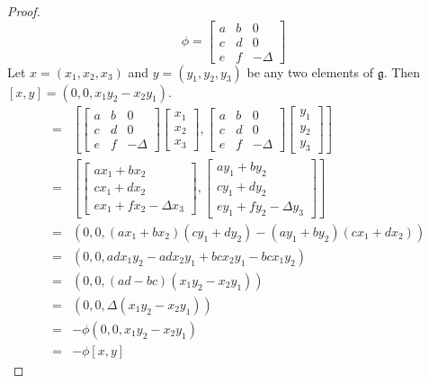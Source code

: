 \documentclass[honours]{UNSWthesis}
\newcommand{\g}{\mathfrak{g}}
\newcommand{\1}{\mathbf{e}_{1}}
\newcommand{\2}{\mathbf{e}_{3}}
\newcommand{\3}{\mathbf{e}_{3}}
\begin{document}
\begin{proof}
\[
\phi = 
\begin{bmatrix}
a & b & 0 \\
c & d & 0 \\
e & f & -\Delta
\end{bmatrix}
\]
Let $x=(x_{1},x_{2},x_{3})$ and $y=(y_{1},y_{2},y_{3})$ be any two elements of $\g$. Then $[x,y]=(0,0,x_{1}y_{2}-x_{2}y_{1})$. 
\begin{eqnarray*}
[\phi(x),\phi(y)] &=& \left[
\begin{bmatrix}
a & b & 0 \\
c & d & 0 \\
e & f & -\Delta
\end{bmatrix} 
\begin{bmatrix}
x_{1} \\ x_{2} \\ x_{3}
\end{bmatrix}
,
\begin{bmatrix}
a & b & 0 \\
c & d & 0 \\
e & f & -\Delta
\end{bmatrix} 
\begin{bmatrix}
y_{1} \\ y_{2} \\ y_{3}
\end{bmatrix}
\right] \\
&=& \left[
\begin{bmatrix}
ax_{1}+bx_{2} \\ cx_{1}+dx_{2} \\ ex_{1}+fx_{2} - \Delta x_{3}
\end{bmatrix}
,
\begin{bmatrix}
ay_{1}+by_{2} \\ cy_{1}+dy_{2} \\ ey_{1}+fy_{2} - \Delta y_{3}
\end{bmatrix}
\right] \\
&=& (0,0,(ax_{1}+bx_{2})(cy_{1}+dy_{2})-(ay_{1}+by_{2})(cx_{1}+dx_{2})) \\
&=& (0,0, adx_{1}y_{2}  -adx_{2}y_{1}+ bcx_{2}y_{1} -bcx_{1}y_{2} ) \\
&=& (0,0,(ad-bc)(x_{1}y_{2}  -x_{2}y_{1})) \\
&=& (0,0,\Delta(x_{1}y_{2}-x_{2}y_{1})) \\
&=& -\phi(0,0,x_{1}y_{2}-x_{2}y_{1}) \\
&=& -\phi[x,y] 
\end{eqnarray*}
\end{proof}
\end{document}
